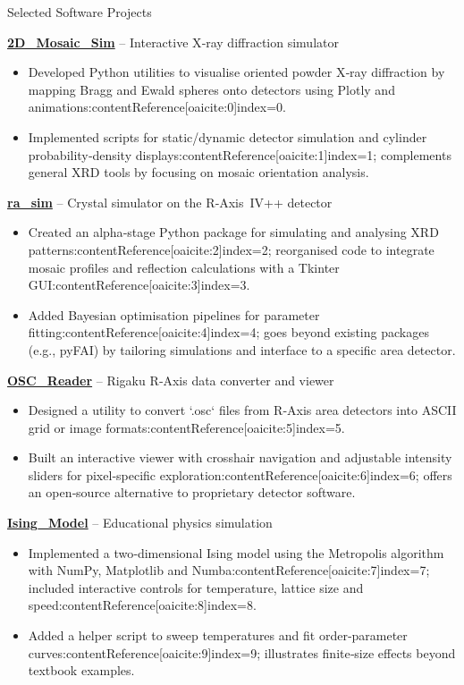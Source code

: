 \begin{rubric}{Selected Software Projects}

  \entry*[2025--Present]%
  \textbf{\href{https://github.com/DVBeckwitt/2D_Mosaic_Sim}{2D\_Mosaic\_Sim}} – Interactive X‑ray diffraction simulator%
  \begin{itemize}
    \item Developed Python utilities to visualise oriented powder X‑ray diffraction by mapping Bragg and Ewald spheres onto detectors using Plotly and animations:contentReference[oaicite:0]{index=0}.
    \item Implemented scripts for static/dynamic detector simulation and cylinder probability‑density displays:contentReference[oaicite:1]{index=1}; complements general XRD tools by focusing on mosaic orientation analysis.
  \end{itemize}

  \entry*[2024--Present]%
  \textbf{\href{https://github.com/DVBeckwitt/ra_sim}{ra\_sim}} – Crystal simulator on the R‑Axis IV++ detector%
  \begin{itemize}
    \item Created an alpha‑stage Python package for simulating and analysing XRD patterns:contentReference[oaicite:2]{index=2}; reorganised code to integrate mosaic profiles and reflection calculations with a Tkinter GUI:contentReference[oaicite:3]{index=3}.
    \item Added Bayesian optimisation pipelines for parameter fitting:contentReference[oaicite:4]{index=4}; goes beyond existing packages (e.g., pyFAI) by tailoring simulations and interface to a specific area detector.
  \end{itemize}

  \entry*[2024]%
  \textbf{\href{https://github.com/DVBeckwitt/OSC_Reader}{OSC\_Reader}} – Rigaku R‑Axis data converter and viewer%
  \begin{itemize}
    \item Designed a utility to convert `.osc` files from R‑Axis area detectors into ASCII grid or image formats:contentReference[oaicite:5]{index=5}.
    \item Built an interactive viewer with crosshair navigation and adjustable intensity sliders for pixel‑specific exploration:contentReference[oaicite:6]{index=6}; offers an open‑source alternative to proprietary detector software.
  \end{itemize}

  \entry*[2025]%
  \textbf{\href{https://github.com/DVBeckwitt/Ising_Model}{Ising\_Model}} – Educational physics simulation%
  \begin{itemize}
    \item Implemented a two‑dimensional Ising model using the Metropolis algorithm with NumPy, Matplotlib and Numba:contentReference[oaicite:7]{index=7}; included interactive controls for temperature, lattice size and speed:contentReference[oaicite:8]{index=8}.
    \item Added a helper script to sweep temperatures and fit order‑parameter curves:contentReference[oaicite:9]{index=9}; illustrates finite‑size effects beyond textbook examples.
  \end{itemize}

\end{rubric}
